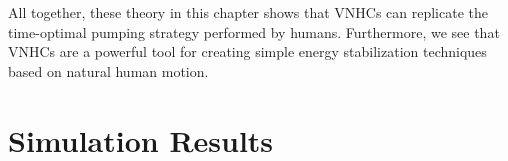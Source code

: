 All together, these theory in this chapter shows that VNHCs can replicate the
time-optimal pumping strategy performed by humans. 
Furthermore, we see that VNHCs are a powerful tool for creating simple energy
stabilization techniques based on natural human motion.

\section{Simulation Results}

